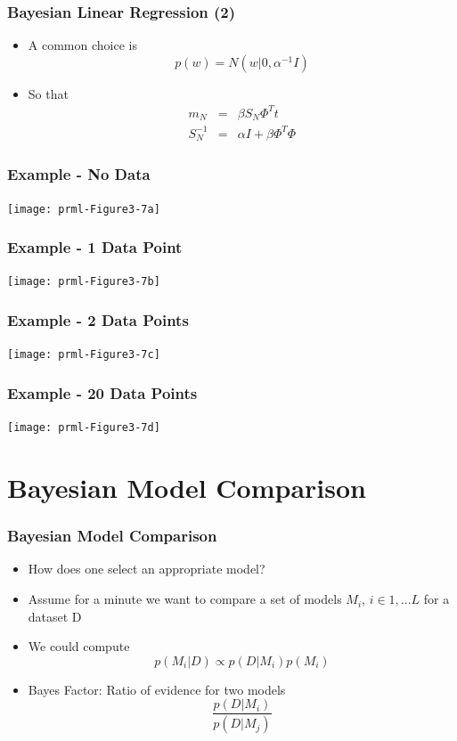 \documentclass[10pt]{beamer}
\begin{document}
\begin{frame}
  \frametitle{Bayesian Linear Regression (2)}
  \begin{itemize}
  \item A common choice is
    \[
    p(w) = N(w|0, \alpha^{-1} I)
    \]
  \item So that
    \begin{eqnarray*}
      m_N & =& \beta S_N \Phi^T t\\
      S_N^{-1} &=& \alpha I + \beta \Phi^T \Phi
    \end{eqnarray*}
  \end{itemize}
\end{frame}

\begin{frame}
  \frametitle{Example - No Data}
  \begin{center}
    \texttt{[image: prml-Figure3-7a]}
  \end{center}
\end{frame}

\begin{frame}
  \frametitle{Example - 1 Data Point}
  \begin{center}
    \texttt{[image: prml-Figure3-7b]}
  \end{center}
\end{frame}

\begin{frame}
  \frametitle{Example - 2 Data Points}
  \begin{center}
    \texttt{[image: prml-Figure3-7c]}
  \end{center}
\end{frame}

\begin{frame}
  \frametitle{Example - 20 Data Points}
  \begin{center}
    \texttt{[image: prml-Figure3-7d]}
  \end{center}
\end{frame}

\section[Model Comparison]{Bayesian Model Comparison}


\begin{frame}
  \frametitle{Bayesian Model Comparison}
  \begin{itemize}
  \item How does one select an appropriate model?
  \item Assume for a minute we want to compare a set of models $M_i$,
    $i \in 1, ... L$ for a dataset D
  \item We could compute
    \[
    p(M_i | D) \propto p(D | M_i) p(M_i)
    \]
  \item Bayes Factor: Ratio of evidence for two models
    \[
    \frac{p(D | M_i )}{p(D | M_j)}
    \]
  \end{itemize}
\end{frame}
\end{document}
